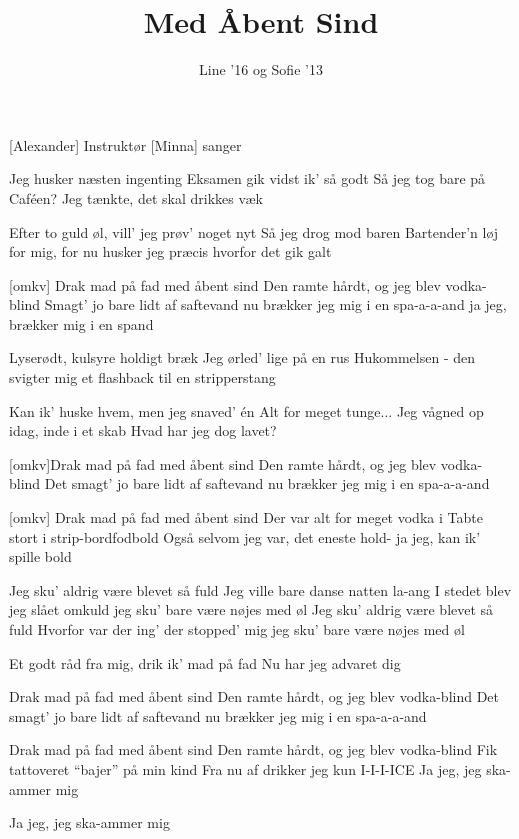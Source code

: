 \documentclass[a4paper,11pt]{article}
\title{Med Åbent Sind}
\author{Line '16 og Sofie '13}
\begin{document}
\maketitle

\begin{roles}
[Alexander] Instruktør
[Minna] sanger
\end{roles}

\begin{song}
   Jeg husker næsten ingenting 
Eksamen gik vidst ik' så godt 
Så jeg tog bare på Caféen? 
Jeg tænkte, det skal drikkes væk 

Efter to guld øl, vill’ jeg prøv’ noget nyt
Så jeg drog mod baren
Bartender’n løj for mig, for nu husker jeg
præcis hvorfor det gik galt


  [omkv] Drak mad på fad med åbent sind 
Den ramte hårdt, og jeg blev vodka-blind
Smagt' jo bare lidt af saftevand
nu brækker jeg mig i en spa-a-a-and
ja jeg, brækker mig i en spand

 Lyserødt, kulsyre holdigt bræk
Jeg ørled’ lige på en rus
Hukommelsen - den svigter mig 
et flashback til en stripperstang 

Kan ik’ huske hvem, men jeg snaved’ én
Alt for meget tunge...
Jeg vågned op idag, inde i et skab
Hvad har jeg dog lavet?

[omkv]Drak mad på fad med åbent sind 
Den ramte hårdt, og jeg blev vodka-blind
Det smagt’ jo bare lidt af saftevand 
nu brækker jeg mig i en spa-a-a-and

[omkv] Drak mad på fad med åbent sind
Der var alt for meget vodka i
Tabte stort i strip-bordfodbold
Også selvom jeg var, det eneste hold- 
ja jeg, kan ik’ spille bold

Jeg sku’ aldrig være blevet så fuld
Jeg ville bare danse natten la-ang 
I stedet blev jeg slået omkuld
jeg sku’ bare være nøjes med øl
Jeg sku’ aldrig være blevet så fuld
Hvorfor var der ing’ der stopped’ mig
jeg sku’ bare være nøjes med øl

Et godt råd fra mig, drik ik’ mad på fad
Nu har jeg advaret dig

Drak mad på fad med åbent sind 
Den ramte hårdt, og jeg blev vodka-blind
Det smagt’ jo  bare lidt af saftevand 
nu brækker jeg mig i en spa-a-a-and

Drak mad på fad med åbent sind
Den ramte hårdt, og jeg blev vodka-blind
Fik tattoveret “bajer” på min kind
Fra nu af drikker jeg kun I-I-I-ICE
Ja jeg, jeg ska-ammer mig

Ja jeg, jeg ska-ammer mig


\end{song}
\end{document}
